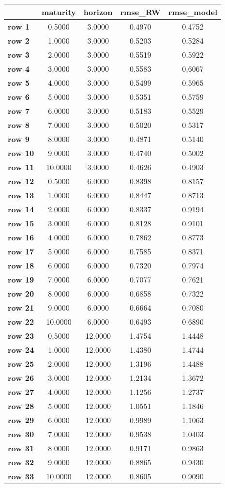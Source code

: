 \begin{tiny}\begin{tabular}{|l|c|c|c|c|}
\hline
&\textbf{maturity}&\textbf{horizon}&\textbf{rmse_RW}&\textbf{rmse_model}\\\hline
\textbf{row 1}&0.5000&3.0000&0.4970&0.4752\\\hline
\textbf{row 2}&1.0000&3.0000&0.5203&0.5284\\\hline
\textbf{row 3}&2.0000&3.0000&0.5519&0.5922\\\hline
\textbf{row 4}&3.0000&3.0000&0.5583&0.6067\\\hline
\textbf{row 5}&4.0000&3.0000&0.5499&0.5965\\\hline
\textbf{row 6}&5.0000&3.0000&0.5351&0.5759\\\hline
\textbf{row 7}&6.0000&3.0000&0.5183&0.5529\\\hline
\textbf{row 8}&7.0000&3.0000&0.5020&0.5317\\\hline
\textbf{row 9}&8.0000&3.0000&0.4871&0.5140\\\hline
\textbf{row 10}&9.0000&3.0000&0.4740&0.5002\\\hline
\textbf{row 11}&10.0000&3.0000&0.4626&0.4903\\\hline
\textbf{row 12}&0.5000&6.0000&0.8398&0.8157\\\hline
\textbf{row 13}&1.0000&6.0000&0.8447&0.8713\\\hline
\textbf{row 14}&2.0000&6.0000&0.8337&0.9194\\\hline
\textbf{row 15}&3.0000&6.0000&0.8128&0.9101\\\hline
\textbf{row 16}&4.0000&6.0000&0.7862&0.8773\\\hline
\textbf{row 17}&5.0000&6.0000&0.7585&0.8371\\\hline
\textbf{row 18}&6.0000&6.0000&0.7320&0.7974\\\hline
\textbf{row 19}&7.0000&6.0000&0.7077&0.7621\\\hline
\textbf{row 20}&8.0000&6.0000&0.6858&0.7322\\\hline
\textbf{row 21}&9.0000&6.0000&0.6664&0.7080\\\hline
\textbf{row 22}&10.0000&6.0000&0.6493&0.6890\\\hline
\textbf{row 23}&0.5000&12.0000&1.4754&1.4448\\\hline
\textbf{row 24}&1.0000&12.0000&1.4380&1.4744\\\hline
\textbf{row 25}&2.0000&12.0000&1.3196&1.4488\\\hline
\textbf{row 26}&3.0000&12.0000&1.2134&1.3672\\\hline
\textbf{row 27}&4.0000&12.0000&1.1256&1.2737\\\hline
\textbf{row 28}&5.0000&12.0000&1.0551&1.1846\\\hline
\textbf{row 29}&6.0000&12.0000&0.9989&1.1063\\\hline
\textbf{row 30}&7.0000&12.0000&0.9538&1.0403\\\hline
\textbf{row 31}&8.0000&12.0000&0.9171&0.9863\\\hline
\textbf{row 32}&9.0000&12.0000&0.8865&0.9430\\\hline
\textbf{row 33}&10.0000&12.0000&0.8605&0.9090\\\hline
\end{tabular}
\end{tiny}
